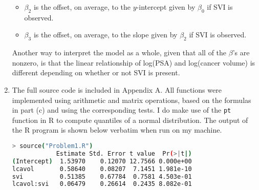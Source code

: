 \documentclass[11pt]{article}
\renewcommand\;{\,}
\begin{document}
\begin{enumerate}[label=(\alph*)]
\begin{itemize}
\item $\beta_2$ is the offset, on average, to the $y$-intercept given by $\beta_0$ if SVI is observed.
\item $\beta_3$ is the offset, on average, to the slope given by $\beta_2$ if SVI is observed.
\end{itemize}
Another way to interpret the model as a whole, given that all of the $\beta$'s are nonzero, is that the linear relationship of log(PSA) and log(cancer volume) is different depending on whether or not SVI is present.
\item
The full source code is included in Appendix A. All functions were implemented using arithmetic and matrix operations, based on the formulas in part (c) and using the corresponding tests. I do make use of the \texttt{pt} function in R to compute  quantiles of a normal distribution.
The output of the R program is shown below verbatim when run on my machine. 
\newpage
\begin{lstlisting}[language=bash]
> source("Problem1.R")
            Estimate Std. Error t value  Pr(>|t|)
(Intercept)  1.53970    0.12070 12.7566 0.000e+00
lcavol       0.58640    0.08207  7.1451 1.981e-10
svi          0.51385    0.67784  0.7581 4.503e-01
lcavol:svi   0.06479    0.26614  0.2435 8.082e-01


\end{lstlisting}
\end{enumerate}
\end{document}
